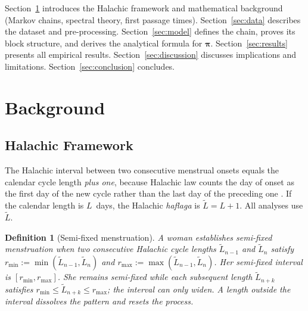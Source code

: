 \documentclass[12pt,a4paper]{article}
\newtheorem{definition}{Definition}
\newcommand{\piv}{\boldsymbol{\pi}}
\begin{document}
Section~\ref{sec:background} introduces the Halachic framework and mathematical
background (Markov chains, spectral theory, first passage times).
Section~\ref{sec:data} describes the dataset and pre-processing.
Section~\ref{sec:model} defines the chain, proves its block structure, and derives
the analytical formula for $\piv$.
Section~\ref{sec:results} presents all empirical results.
Section~\ref{sec:discussion} discusses implications and limitations.
Section~\ref{sec:conclusion} concludes.

\section{Background}
\label{sec:background}

\subsection{Halachic Framework}
\label{sec:halacha}

The Halachic interval between two consecutive menstrual onsets equals the calendar
cycle length \emph{plus one}, because Halachic law counts the day of onset as the
first day of the new cycle rather than the last day of the preceding one
\citep{ShulchanAruch}.  If the calendar length is $L$~days, the Halachic
\emph{haflaga} is $\tilde{L} = L + 1$.  All analyses use $\tilde{L}$.

\begin{definition}[Semi-fixed menstruation]\label{def:semi-fixed}
A woman establishes \emph{semi-fixed menstruation} when two consecutive Halachic
cycle lengths $\tilde{L}_{n-1}$ and $\tilde{L}_{n}$ satisfy
$r_{\min} := \min(\tilde{L}_{n-1},\tilde{L}_{n})$ and
$r_{\max} := \max(\tilde{L}_{n-1},\tilde{L}_{n})$.
Her \emph{semi-fixed interval} is $[r_{\min}, r_{\max}]$.
She remains semi-fixed while each subsequent length $\tilde{L}_{n+k}$ satisfies
$r_{\min} \le \tilde{L}_{n+k} \le r_{\max}$; the interval can only widen.
A length outside the interval dissolves the pattern and resets the process.
\end{definition}
\end{document}
